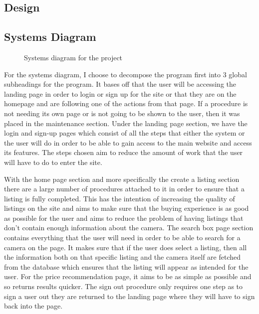 \begin{landscape}
\begin{adjustbox}{minipage=\linewidth}
\chapter{Design}
\vspace{-1.5cm}\section{Systems Diagram}
\begin{figure}[H]
    \vspace{-0.5cm}
    \vspace{-0.5cm}\caption{Systems diagram for the project}
    \label{fig:sysdiagram}
\end{figure}
\end{adjustbox}
\restoregeometry
\end{landscape}

For the systems diagram, I choose to decompose the program first into 3 global subheadings for the program. It bases off that the user will be accessing the landing page in order to login or sign up for the site or that they are on the homepage and are following one of the actions from that page. If a procedure is not needing its own page or is not going to be shown to the user, then it was placed in the maintenance section. 
Under the landing page section, we have the login and sign-up pages which consist of all the steps that either the system or the user will do in order to be able to gain access to the main website and access its features. The steps chosen aim to reduce the amount of work that the user will have to do to enter the site. 

With the home page section and more specifically the create a listing section there are a large number of procedures attached to it in order to ensure that a listing is fully completed. This has the intention of increasing the quality of listings on the site and aims to make sure that the buying experience is as good as possible for the user and aims to reduce the problem of having listings that don’t contain enough information about the camera. The search box page section contains everything that the user will need in order to be able to search for a camera on the page. It makes sure that if the user does select a listing, then all the information both on that specific listing and the camera itself are fetched from the database which ensures that the listing will appear as intended for the user. For the price recommendation page, it aims to be as simple as possible and so returns results quicker. The sign out procedure only requires one step as to sign a user out they are returned to the landing page where they will have to sign back into the page.


